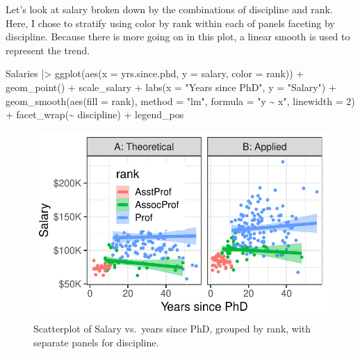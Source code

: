 \documentclass[
  letterpaper,
  10pt,
  krantz2]{krantz}
\makeatletter
\newenvironment{Shaded}{\begin{snugshade}}{\end{snugshade}}
\newcommand{\AttributeTok}[1]{\textcolor[rgb]{0.40,0.45,0.13}{#1}}
\newcommand{\DecValTok}[1]{\textcolor[rgb]{0.68,0.00,0.00}{#1}}
\newcommand{\FunctionTok}[1]{\textcolor[rgb]{0.28,0.35,0.67}{#1}}
\newcommand{\NormalTok}[1]{\textcolor[rgb]{0.00,0.23,0.31}{#1}}
\newcommand{\SpecialCharTok}[1]{\textcolor[rgb]{0.37,0.37,0.37}{#1}}
\newcommand{\StringTok}[1]{\textcolor[rgb]{0.13,0.47,0.30}{#1}}
\newenvironment{kframe}{%
  \medskip{}
  \setlength{\fboxsep}{.8em}
  \def\at@end@of@kframe{}%
  \ifinner\ifhmode%
  \def\at@end@of@kframe{\end{minipage}}%
  \begin{minipage}{\columnwidth}%
  \fi\fi%
  \def\FrameCommand##1{\hskip\@totalleftmargin \hskip-\fboxsep
  \colorbox{shadecolor}{##1}\hskip-\fboxsep
      \hskip-\linewidth \hskip-\@totalleftmargin \hskip\columnwidth}%
  \MakeFramed {\advance\hsize-\width
    \@totalleftmargin\z@ \linewidth\hsize
    \@setminipage}}%
{\par\unskip\endMakeFramed%
  \at@end@of@kframe}
\renewenvironment{Shaded}{\begin{kframe}}{\end{kframe}}
\makeatother
\begin{document}
Let's look at salary broken down by the combinations of discipline and
rank. Here, I chose to stratify using color by rank within each of
panels faceting by discipline. Because there is more going on in this
plot, a linear smooth is used to represent the trend.

\begin{Shaded}
\begin{Highlighting}[]
\NormalTok{Salaries }\SpecialCharTok{|\textgreater{}}
  \FunctionTok{ggplot}\NormalTok{(}\FunctionTok{aes}\NormalTok{(}\AttributeTok{x =}\NormalTok{ yrs.since.phd, }\AttributeTok{y =}\NormalTok{ salary, }\AttributeTok{color =}\NormalTok{ rank)) }\SpecialCharTok{+}
  \FunctionTok{geom\_point}\NormalTok{() }\SpecialCharTok{+}
\NormalTok{  scale\_salary }\SpecialCharTok{+}
  \FunctionTok{labs}\NormalTok{(}\AttributeTok{x =} \StringTok{"Years since PhD"}\NormalTok{,}
       \AttributeTok{y =} \StringTok{"Salary"}\NormalTok{) }\SpecialCharTok{+}
  \FunctionTok{geom\_smooth}\NormalTok{(}\FunctionTok{aes}\NormalTok{(}\AttributeTok{fill =}\NormalTok{ rank),}
              \AttributeTok{method =} \StringTok{"lm"}\NormalTok{, }\AttributeTok{formula =} \StringTok{"y \textasciitilde{} x"}\NormalTok{, }
              \AttributeTok{linewidth =} \DecValTok{2}\NormalTok{) }\SpecialCharTok{+}
  \FunctionTok{facet\_wrap}\NormalTok{(}\SpecialCharTok{\textasciitilde{}}\NormalTok{ discipline) }\SpecialCharTok{+}
\NormalTok{  legend\_pos}
\end{Highlighting}
\end{Shaded}

\begin{figure}[H]

{\centering \includegraphics[width=1\textwidth,height=\textheight]{figs/ch03/fig-Salaries-faceted-1.pdf}

}

\caption{\label{fig-Salaries-faceted}Scatterplot of Salary vs.~years
since PhD, grouped by rank, with separate panels for discipline.}

\end{figure}
\end{document}
